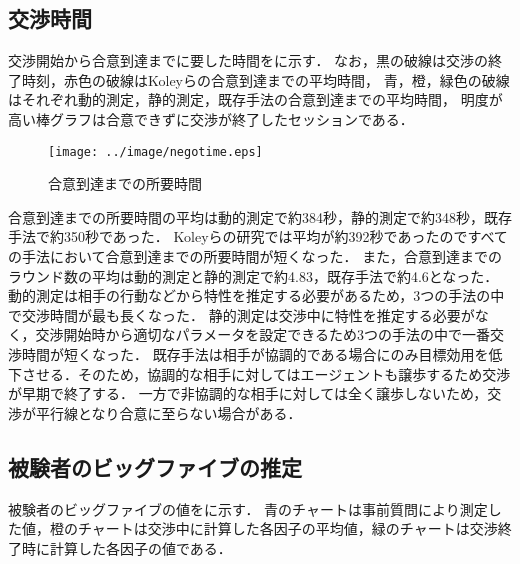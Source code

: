 \subsection{交渉時間}
交渉開始から合意到達までに要した時間をに示す．
なお，黒の破線は交渉の終了時刻，赤色の破線はKoleyらの合意到達までの平均時間，
青，橙，緑色の破線はそれぞれ動的測定，静的測定，既存手法の合意到達までの平均時間，
明度が高い棒グラフは合意できずに交渉が終了したセッションである．

\begin{figure}[bt]
    \centering
    \texttt{[image: ../image/negotime.eps]}
    \caption{合意到達までの所要時間}
    \label{fig:negotime}
\end{figure}

合意到達までの所要時間の平均は動的測定で約384秒，静的測定で約348秒，既存手法で約350秒であった．
Koleyらの研究では平均が約392秒であったのですべての手法において合意到達までの所要時間が短くなった．
また，合意到達までのラウンド数の平均は動的測定と静的測定で約4.83，既存手法で約4.6となった．
動的測定は相手の行動などから特性を推定する必要があるため，3つの手法の中で交渉時間が最も長くなった．
静的測定は交渉中に特性を推定する必要がなく，交渉開始時から適切なパラメータを設定できるため3つの手法の中で一番交渉時間が短くなった．
既存手法は相手が協調的である場合にのみ目標効用を低下させる．そのため，協調的な相手に対してはエージェントも譲歩するため交渉が早期で終了する．
一方で非協調的な相手に対しては全く譲歩しないため，交渉が平行線となり合意に至らない場合がある．

\subsection{被験者のビッグファイブの推定}
被験者のビッグファイブの値をに示す．
青のチャートは事前質問により測定した値，橙のチャートは交渉中に計算した各因子の平均値，緑のチャートは交渉終了時に計算した各因子の値である．

